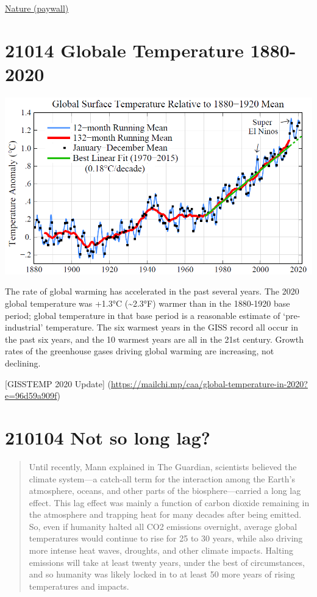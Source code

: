 \documentclass[
]{book}
\begin{document}
\href{https://www.nature.com/articles/s41558-020-00965-9}{Nature (paywall)}

\hypertarget{globale-temperature-1880-2020}{%
\section{21014 Globale Temperature 1880-2020}\label{globale-temperature-1880-2020}}

\includegraphics{fig/Global_Temperature_1880-2020.png}

The rate of global warming has accelerated in the past several years. The 2020 global temperature was +1.3°C (\textasciitilde2.3°F) warmer than in the 1880-1920 base period; global temperature in that base period is a reasonable estimate of `pre-industrial' temperature. The six warmest years in the GISS record all occur in the past six years, and the 10 warmest years are all in the 21st century. Growth rates of the greenhouse gases driving global warming are increasing, not declining.

{[}GISSTEMP 2020 Update{]} (\url{https://mailchi.mp/caa/global-temperature-in-2020?e=96d59a909f})

\hypertarget{not-so-long-lag}{%
\section{210104 Not so long lag?}\label{not-so-long-lag}}

\begin{quote}
Until recently, Mann explained in The Guardian, scientists believed the climate system---a catch-all term for the interaction among the Earth's atmosphere, oceans, and other parts of the biosphere---carried a long lag effect. This lag effect was mainly a function of carbon dioxide remaining in the atmosphere and trapping heat for many decades after being emitted. So, even if humanity halted all CO2 emissions overnight, average global temperatures would continue to rise for 25 to 30 years, while also driving more intense heat waves, droughts, and other climate impacts. Halting emissions will take at least twenty years, under the best of circumstances, and so humanity was likely locked in to at least 50 more years of rising temperatures and impacts.
\end{quote}
\end{document}
